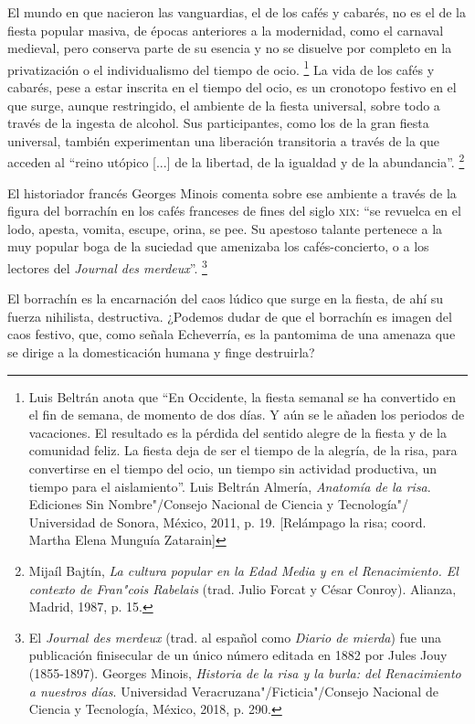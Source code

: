 \documentclass[14pt,twoside,final]{extbook} %
\let\oldfootnote\footnote
\renewcommand\footnote[1]{%
\oldfootnote{\hspace{1mm}#1}}
\begin{document}
El mundo en que nacieron las vanguardias, el de los cafés y cabarés, no es el de la fiesta popular masiva, de épocas anteriores a la modernidad, como el carnaval medieval, pero conserva parte de su
esencia y no se disuelve por completo en la privatización o el individualismo del tiempo de ocio.\footnote{Luis Beltrán anota que ``En Occidente, la fiesta semanal se ha convertido en el fin de semana, de momento de dos días. Y aún se le añaden los periodos de vacaciones. El resultado es la pérdida del sentido alegre de la fiesta y de la comunidad feliz. La fiesta deja de ser el tiempo de la alegría, de la risa, para convertirse en el tiempo del ocio, un tiempo sin actividad productiva, un tiempo para el aislamiento''. Luis Beltrán Almería, \emph{Anatomía de la risa}. Ediciones Sin Nombre"/Consejo Nacional de Ciencia y Tecnología"/ Universidad de Sonora, México, 2011, p. 19. [Relámpago la risa; coord. Martha Elena Munguía Zatarain]} La vida de los cafés y cabarés, pese a estar inscrita en el tiempo del ocio, es un cronotopo festivo en el que surge, aunque restringido, el ambiente de la fiesta universal, sobre todo a través de la ingesta de alcohol. Sus participantes, como los de la gran fiesta universal, también experimentan una liberación transitoria a través de la que acceden al ``reino utópico [...] de la libertad, de la igualdad y de la abundancia''.\footnote{Mijaíl Bajtín, \emph{La cultura popular en la Edad Media y en el Renacimiento. El contexto de Fran"cois Rabelais} (trad. Julio Forcat y César Conroy). Alianza, Madrid, 1987, p. 15.}

El historiador francés Georges Minois comenta sobre ese ambiente a través de la figura del borrachín en los cafés franceses de fines del siglo \textsc{xix}: ``se revuelca en el lodo, apesta, vomita, escupe, orina, se pee. Su apestoso talante pertenece a la muy popular boga de la suciedad que amenizaba los cafés-concierto, o a los lectores del \emph{Journal des merdeux}''.\footnote{El \emph{Journal des merdeux} (trad. al español como \emph{Diario de mierda}) fue una publicación finisecular de un único número editada en 1882 por Jules Jouy (1855-1897). Georges Minois, \emph{Historia de la risa y la burla: del Renacimiento a nuestros días}. Universidad Veracruzana"/Ficticia"/Consejo Nacional de Ciencia y Tecnología, México, 2018, p. 290.}

El borrachín es la encarnación del caos lúdico que surge en la fiesta, de ahí su fuerza nihilista, destructiva. ¿Podemos dudar de que el borrachín es imagen del caos festivo, que, como señala Echeverría, es la pantomima de una amenaza que se dirige a la domesticación humana y finge destruirla?
\end{document}
